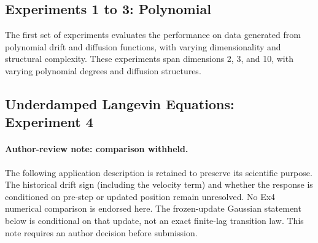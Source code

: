 \documentclass{article}
\begin{document}
\subsection{Experiments 1 to 3: Polynomial}
The first set of experiments evaluates the performance on data generated from polynomial drift and diffusion functions, with varying dimensionality and structural complexity. These experiments span dimensions 2, 3, and 10, with varying polynomial degrees and diffusion structures.


\subsection{Underdamped Langevin Equations: Experiment 4}
\paragraph{Author-review note: comparison withheld.}
The following application description is retained to preserve its scientific purpose. The historical drift sign (including the velocity term) and whether the response is conditioned on pre-step or updated position remain unresolved. No Ex4 numerical comparison is endorsed here. The frozen-update Gaussian statement below is conditional on that update, not an exact finite-lag transition law. This note requires an author decision before submission.
\end{document}
